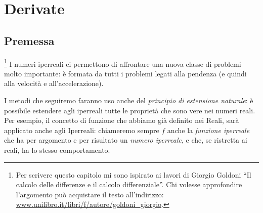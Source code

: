 



\chapter{Derivate}

% 

\section{Premessa}
\footnote{Per scrivere questo capitolo mi sono ispirato 
ai lavori di Giorgio Goldoni ``Il calcolo delle differenze e il calcolo 
differenziale''. 
Chi volesse approfondire l'argomento può acquistare il testo 
all'indirizzo: 
\href{https://www.unilibro.it/libri/f/autore/goldoni\_giorgio}
     {www.unilibro.it/libri/f/autore/goldoni\_giorgio}.}
I numeri iperreali ci permettono di affrontare una nuova classe di problemi 
molto importante: è formata da tutti i problemi legati alla pendenza (e 
quindi alla velocità e all'accelerazione).

I metodi che seguiremo faranno uso anche del \emph{principio di estensione 
naturale}: è possibile estendere agli iperreali tutte le proprietà che 
sono vere nei numeri reali.
Per esempio, il concetto di funzione che abbiamo già definito nei Reali, 
sarà applicato anche agli Iperreali: chiameremo sempre \(f\) anche
la \emph{funzione iperreale} che ha per argomento e per risultato un 
\emph{numero iperreale}, e che, se ristretta ai reali, ha lo stesso 
comportamento.

